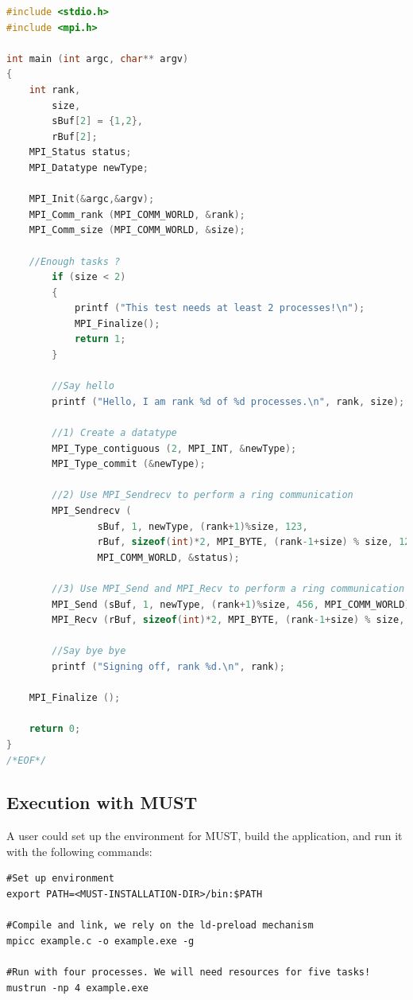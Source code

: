 \documentclass[english]{scrartcl}
\begin{document}
\begin{lstlisting}[tabsize=3,numbers=none,basicstyle=\scriptsize,%
	breaklines=true,language=C, frame=single,%
	commentstyle=\color{LGREY}, keywordstyle=\bfseries,%
	identifierstyle=\bfseries, numbers=left, numbersep=5pt,numberstyle=\tiny,%
	name=example-interface-listing, firstnumber=1]
#include <stdio.h>
#include <mpi.h>

int main (int argc, char** argv)
{
    int rank,
        size,
        sBuf[2] = {1,2},
        rBuf[2];
    MPI_Status status;
    MPI_Datatype newType;

    MPI_Init(&argc,&argv);
    MPI_Comm_rank (MPI_COMM_WORLD, &rank);
    MPI_Comm_size (MPI_COMM_WORLD, &size);

    //Enough tasks ?
    	if (size < 2)
    	{
    		printf ("This test needs at least 2 processes!\n");
    		MPI_Finalize();
    		return 1;
    	}

    	//Say hello
    	printf ("Hello, I am rank %d of %d processes.\n", rank, size);

    	//1) Create a datatype
    	MPI_Type_contiguous (2, MPI_INT, &newType);
    	MPI_Type_commit (&newType);

    	//2) Use MPI_Sendrecv to perform a ring communication
    	MPI_Sendrecv (
    	        sBuf, 1, newType, (rank+1)%size, 123,
    	        rBuf, sizeof(int)*2, MPI_BYTE, (rank-1+size) % size, 123,
    	        MPI_COMM_WORLD, &status);

    	//3) Use MPI_Send and MPI_Recv to perform a ring communication
    	MPI_Send (sBuf, 1, newType, (rank+1)%size, 456, MPI_COMM_WORLD);
    	MPI_Recv (rBuf, sizeof(int)*2, MPI_BYTE, (rank-1+size) % size, 456, MPI_COMM_WORLD, &status);

    	//Say bye bye
    	printf ("Signing off, rank %d.\n", rank);

    MPI_Finalize ();

    return 0;
}
/*EOF*/
\end{lstlisting}

\subsection{Execution with MUST}

A user could set up the environment for MUST, build the application, and run
it with the following commands:

\begin{verbatim}
#Set up environment
export PATH=<MUST-INSTALLATION-DIR>/bin:$PATH

#Compile and link, we rely on the ld-preload mechanism
mpicc example.c -o example.exe -g

#Run with four processes. We will need resources for five tasks!
mustrun -np 4 example.exe
\end{verbatim}
\end{document}
